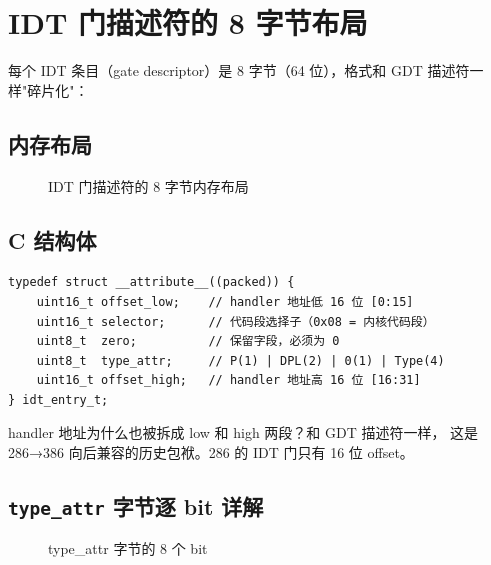 \section{IDT 门描述符的 8 字节布局}

每个 IDT 条目（gate descriptor）是 8 字节（64 位），格式和 GDT 描述符一样"碎片化"：

\subsection{内存布局}

\begin{figure}[H]
  \centering
  
  \caption{IDT 门描述符的 8 字节内存布局}
  \label{fig:idt-gate-layout}
\end{figure}

\subsection{C 结构体}

\begin{lstlisting}[style=cstyle]
typedef struct __attribute__((packed)) {
    uint16_t offset_low;    // handler 地址低 16 位 [0:15]
    uint16_t selector;      // 代码段选择子（0x08 = 内核代码段）
    uint8_t  zero;          // 保留字段，必须为 0
    uint8_t  type_attr;     // P(1) | DPL(2) | 0(1) | Type(4)
    uint16_t offset_high;   // handler 地址高 16 位 [16:31]
} idt_entry_t;
\end{lstlisting}

\begin{thinkbox}
handler 地址为什么也被拆成 low 和 high 两段？和 GDT 描述符一样，
这是 286→386 向后兼容的历史包袱。286 的 IDT 门只有 16 位 offset。
\end{thinkbox}

\subsection{\texttt{type\_attr} 字节逐 bit 详解}

\begin{figure}[H]
  \centering
  
  \caption{type\_attr 字节的 8 个 bit}
\end{figure}

